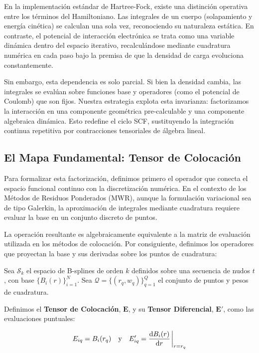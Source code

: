\documentclass[12pt, a4paper, oneside, spanish]{article}
\begin{document}
En la implementación estándar de Hartree-Fock, existe una distinción operativa entre los términos del Hamiltoniano. Las integrales de un cuerpo (solapamiento y energía cinética) se calculan una sola vez, reconociendo su naturaleza estática. En contraste, el potencial de interacción electrónica se trata como una variable dinámica dentro del espacio iterativo, recalculándose mediante cuadratura numérica en cada paso bajo la premisa de que la densidad de carga evoluciona constantemente.

Sin embargo, esta dependencia es solo parcial. Si bien la densidad cambia, las integrales se evalúan sobre funciones base y operadores (como el potencial de Coulomb) que son fijos. Nuestra estrategia explota esta invarianza: factorizamos la interacción en una componente geométrica pre-calculable y una componente algebraica dinámica. Esto redefine el ciclo SCF, sustituyendo la integración continua repetitiva por contracciones tensoriales de álgebra lineal.

\subsection{El Mapa Fundamental: Tensor de Colocación}

Para formalizar esta factorización, definimos primero el operador que conecta el espacio funcional continuo con la discretización numérica. En el contexto de los Métodos de Residuos Ponderados (MWR), aunque la formulación variacional sea de tipo Galerkin, la aproximación de integrales mediante cuadratura requiere evaluar la base en un conjunto discreto de puntos.

La operación resultante es algebraicamente equivalente a la matriz de evaluación utilizada en los métodos de colocación. Por consiguiente, definimos los operadores que proyectan la base y sus derivadas sobre los puntos de cuadratura:

\begin{definition}

  Sea \( \mathcal{S}_k \) el espacio de B-splines de orden \( k \) definidos sobre una secuencia de nudos \( t \), con base \( \{ B_i(r) \}_{i=1}^N \).
  Sea \( \mathcal{Q} = \{ (r_q,w_q) \}_{q=1}^Q \) el conjunto de puntos y pesos de cuadratura.

  Definimos el \textbf{Tensor de Colocación}, \( \bm{E} \), y su \textbf{Tensor Diferencial}, \( \bm{E}' \), como las evaluaciones puntuales:

  \begin{equation}
    \label{eq:collocation-tensor}
    E_{iq} = B_i(r_q) \quad \text{y} \quad E'_{iq} = \dv{B_i(r)}{r} \eval_{r=r_q}
  \end{equation}

\end{definition}
\end{document}
